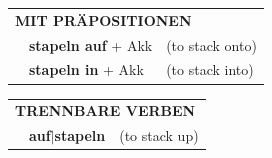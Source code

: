 \documentclass[10pt,a4paper]{revtex4-2}
\begin{document}
\begin{verbbox}
\vspace{10pt}

\begin{tabular}{lll}
\multicolumn{3}{l}{\textbf{MIT PRÄPOSITIONEN}}\\
& \textbf{stapeln auf} + Akk & (to stack onto)\\
& \textbf{stapeln in} + Akk & (to stack into)\\
\end{tabular}
\hfill
\begin{tabular}{lll}
\multicolumn{3}{l}{\textbf{TRENNBARE VERBEN}}\\
& \textbf{auf$|$stapeln} & (to stack up)\\
\end{tabular}
\vspace{-5pt}
\end{verbbox}
\end{document}
